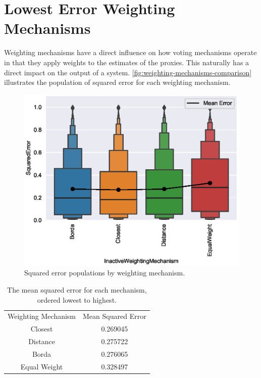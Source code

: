 \section{Lowest Error Weighting Mechanisms}\label{sec:lowest-error-weighting-mechanism}
Weighting mechanisms have a direct influence on how voting mechanisms operate in that
they apply weights to the estimates of the proxies.
This naturally has a direct impact on the output of a system.
\autoref{fig:weighting-mechanisms-comparison} illustrates the population of
squared error for each weighting mechanism.

\begin{figure}[htbp]
    \centering
    \includegraphics[scale=0.75]
    {./content/figures/weighting_mechanisms/weighting_mechanisms_comparison}
    \caption{Squared error populations by weighting mechanism.}
    \label{fig:weighting-mechanisms-comparison}
\end{figure}

\begin{table}[htbp]
    \renewcommand{\arraystretch}{1.0}

    \caption{The mean squared error for each mechanism, ordered lowest to highest.}
    \label{tab:weighting-mechanism-mean-error}

    \centering
    \begin{tabular}{|c|c|}
        \hline
        Weighting Mechanism & Mean Squared Error \\
        \hhline{|=|=|}
        Closest             & 0.269045           \\
        \hline
        Distance            & 0.275722           \\
        \hline
        Borda               & 0.276065           \\
        \hline
        Equal Weight        & 0.328497           \\
        \hline
    \end{tabular}
\end{table}


